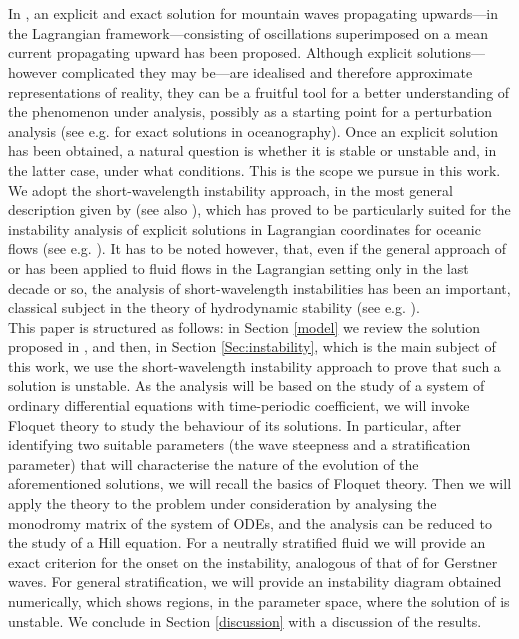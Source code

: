 \documentclass[reqno]{amsart}
\begin{document}
\\
\\
In \cite{ConstantinMountain2023}, an explicit and exact solution for mountain waves propagating upwards---in the Lagrangian framework---consisting of oscillations superimposed on a mean current propagating upward has been proposed.  
Although explicit solutions—however complicated they may be—are idealised and therefore approximate representations of reality, they can be a fruitful tool for a better understanding of the phenomenon under analysis, possibly as a starting point for a perturbation analysis (see e.g. \cite{C_JPO, Abrashkin, P_DIE} for exact solutions in oceanography). Once an explicit solution has been obtained, a natural question is whether it is stable or unstable and, in the latter case, under what conditions. This is the scope we pursue in this work.\\
We adopt the short-wavelength instability approach, in the most general description given by \cite{LH} (see also \cite{Bayly, FriedlanderVishik1991}), which has proved to be particularly suited for the instability analysis of explicit solutions in Lagrangian coordinates for oceanic flows (see e.g. \cite{Leblanc2004,CG,Kruse,Kruse2,mioInstability}). It has to be noted however, that, even if the general approach of \cite{LH,LebovitzL} or \cite{FriedlanderVishik1991, Friedlander} has been applied to fluid flows in the Lagrangian setting only in the last decade or so, the analysis of short-wavelength instabilities has been an important, classical subject in the theory of hydrodynamic stability (see e.g. \cite{ES78,ES80,LS83}).\\
This paper is structured as follows: in Section \ref{model} we review the solution proposed in \cite{ConstantinMountain2023}, and then, in Section \ref{Sec:instability}, which is the main subject of this work, we use the short-wavelength instability approach to prove that such a solution is unstable. As the analysis will be based on the study of a system of ordinary differential equations with time-periodic coefficient, we will invoke Floquet theory to study the behaviour of its solutions. In particular, after identifying two suitable parameters (the wave steepness and a stratification parameter) that will characterise the nature of the evolution of the aforementioned solutions, we will recall the basics of Floquet theory. Then we will apply the theory to the problem under consideration by analysing the monodromy matrix of the system of ODEs, and the analysis can be reduced to the study of a Hill equation. For a neutrally stratified fluid we will provide an exact criterion for the onset on the instability, analogous of that of \cite{Leblanc2004} for Gerstner waves. For general stratification, we will provide an instability diagram obtained numerically, which shows regions, in the parameter space, where the solution of \cite{ConstantinMountain2023} is unstable.  We conclude in Section \ref{discussion} with a discussion of the results.
\end{document}
